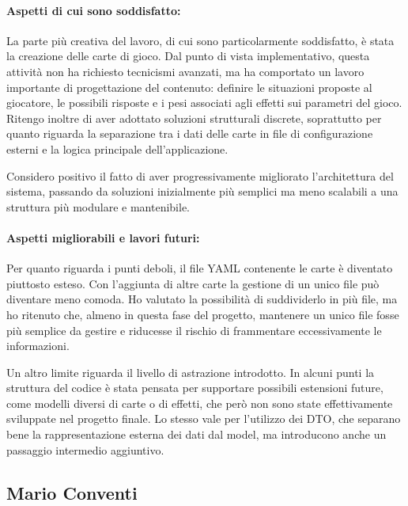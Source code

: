 \documentclass[11pt, a4paper, oneside]{report}
\begin{document}
\paragraph{Aspetti di cui sono soddisfatto:}
La parte più creativa del lavoro, di cui sono particolarmente soddisfatto, è stata la 
creazione delle carte di gioco. Dal punto di vista implementativo, questa attività non ha 
richiesto tecnicismi avanzati, ma ha comportato un lavoro importante di progettazione del 
contenuto: definire le situazioni proposte al giocatore, le possibili risposte e i pesi 
associati agli effetti sui parametri del gioco. Ritengo inoltre di aver adottato soluzioni 
strutturali discrete, soprattutto per quanto riguarda la separazione tra i dati delle carte 
in file di configurazione esterni e la logica principale dell'applicazione.

Considero positivo il fatto di aver progressivamente migliorato l'architettura del sistema, 
passando da soluzioni inizialmente più semplici ma meno scalabili a una struttura più modulare 
e mantenibile. 

\paragraph{Aspetti migliorabili e lavori futuri:}
Per quanto riguarda i punti deboli, il file YAML contenente le carte è diventato piuttosto 
esteso. Con l'aggiunta di altre carte la gestione di un unico file può diventare meno comoda. 
Ho valutato la possibilità di suddividerlo in più file, ma ho ritenuto che, almeno in questa 
fase del progetto, mantenere un unico file fosse più semplice da gestire e riducesse il 
rischio di frammentare eccessivamente le informazioni.

Un altro limite riguarda il livello di astrazione introdotto. In alcuni punti la struttura 
del codice è stata pensata per supportare possibili estensioni future, come modelli diversi 
di carte o di effetti, che però non sono state effettivamente sviluppate nel progetto finale. 
Lo stesso vale per l'utilizzo dei DTO, che separano bene la rappresentazione esterna dei dati 
dal model, ma introducono anche un passaggio intermedio aggiuntivo.

\subsection{Mario Conventi}
\end{document}
